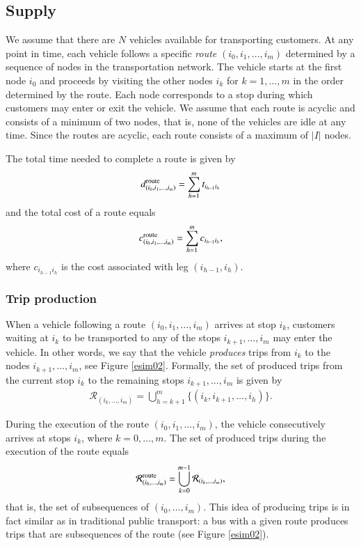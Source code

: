 \documentclass[dissertation,draft*]{aaltoseries}
\begin{document}
\subsection{Supply}
\label{vehiclemovements}
We assume that there are $N$ vehicles available for transporting customers. 
At any point in time, each vehicle follows a specific \emph{route} $(i_0,i_1,\ldots,i_m)$ 
determined by a sequence of nodes in the transportation network.
The vehicle starts at the first node $i_0$ and proceeds by visiting the other nodes $i_k$
for $k=1,\ldots,m$ in the order determined by the route.
Each node corresponds to a stop during which customers may enter or exit the vehicle.
We assume that each route is acyclic and consists of a minimum of two nodes, that is, none of the
vehicles are idle at any time. Since the routes are acyclic, each route consists of
a maximum of $|I|$ nodes.

The total time needed to complete a route is given by 
\begin{align}
\label{totaltime}
d_{(i_0,i_1,\ldots,i_m)}^{\rm route} = \sum_{h=1}^m t_{i_{h-1} i_h}
\end{align}
and the total cost of a route equals 
\begin{align}
\label{totalcost}
c_{(i_0,i_1,\ldots,i_m)}^{\rm route} = \sum_{h=1}^m c_{i_{h-1} i_h},
\end{align}
where $c_{i_{h-1}i_h}$ is the cost associated with leg $(i_{h-1},i_h)$.


\subsubsection{Trip production}
When a vehicle following a route $(i_0,i_1,\ldots,i_m)$ arrives at stop $i_k$, customers waiting at $i_k$ to
be transported to any of the stops $i_{k+1},\ldots,i_m$ may enter the vehicle.
In other words, we say that the vehicle \emph{produces} trips from $i_k$ to the nodes $i_{k+1},\ldots,i_m$, see Figure \ref{esim02}.
Formally, the set of produced trips from the current stop $i_k$ to the remaining stops $i_{k+1},\ldots,i_m$ is given by
\begin{align}
\label{tripproduction}
\mathcal{R}_{(i_k,\ldots, i_m)} = \bigcup_{h =k+1}^m \{(i_k,i_{k+1},\ldots,i_h)\}.  
\end{align}


During the execution of the route $(i_0,i_1,\ldots,i_m)$, the vehicle consecutively arrives at stops $i_k$,
where $k=0,\ldots,m$. 
The set of produced trips during the execution of the route equals
\begin{align}
\label{routeproduction}
\mathcal{R}_{(i_0,\ldots, i_m)}^{\rm route} = \bigcup_{k =0}^{m-1} \mathcal{R}_{(i_k,\ldots, i_m)},
\end{align}
that is, the set of subsequences of $(i_0,\ldots, i_m)$. This idea of producing trips 
is in fact similar as in traditional public transport: a bus with a given route 
produces trips that are subsequences of the route (see Figure \ref{esim02}).
\end{document}

